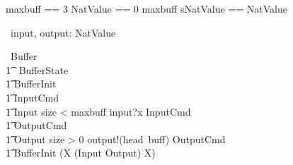 \documentclass{article}
\begin{document}
\begin{zed}
 maxbuff == 3
 \also NatValue == 0 \upto maxbuff
 \also sNatValue == \seq NatValue
\end{zed}

\begin{circus}
	\circchannel\ input, output: NatValue \\
\end{circus}

\begin{circus}
	\circprocess\ Buffer \circdef \circbegin \\
    	\t1 \circstate\ BufferState  \\
    	\t1	BufferInit  \\
		\t1 InputCmd  \\
        \t1 Input \circdef \lcircguard size < maxbuff \rcircguard \circguard input?x \then \lschexpract InputCmd \rschexpract \\
		\t1 OutputCmd  \\
        \t1 Output \circdef \lcircguard size > 0 \rcircguard \circguard output!(head~buff) \then \lschexpract OutputCmd \rschexpract \\
	\t1 \circspot \lschexpract BufferInit \rschexpract \circseq (\circmu X \circspot (Input \extchoice Output) \circseq X) \\
	\circend
\end{circus}
\end{document}
